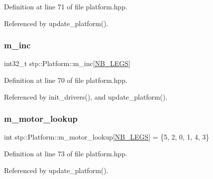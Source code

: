 Definition at line 71 of file platform.\+hpp.



Referenced by update\+\_\+platform().

\mbox{\label{classstp_1_1_platform_a8b8a183817a7536262e83e51edd4250a}} 
\subsubsection{\texorpdfstring{m\+\_\+inc}{m\_inc}}
{\footnotesize\ttfamily int32\+\_\+t stp\+::\+Platform\+::m\+\_\+inc\mbox{[}\hyperlink{model_8hpp_ae44092ed043cb4350e2df47fdee890b9}{N\+B\+\_\+\+L\+E\+GS}\mbox{]}\hspace{0.3cm}{\ttfamily [private]}}



Definition at line 70 of file platform.\+hpp.



Referenced by init\+\_\+drivers(), and update\+\_\+platform().

\mbox{\label{classstp_1_1_platform_a5a13db3be1f7180271f5045905c2b5e3}} 
\subsubsection{\texorpdfstring{m\+\_\+motor\+\_\+lookup}{m\_motor\_lookup}}
{\footnotesize\ttfamily int stp\+::\+Platform\+::m\+\_\+motor\+\_\+lookup\mbox{[}\hyperlink{model_8hpp_ae44092ed043cb4350e2df47fdee890b9}{N\+B\+\_\+\+L\+E\+GS}\mbox{]} = \{5, 2, 0, 1, 4, 3\}\hspace{0.3cm}{\ttfamily [private]}}



Definition at line 73 of file platform.\+hpp.



Referenced by update\+\_\+platform().

\mbox{\label{classstp_1_1_platform_aad5d3ee79554303bbdc928183155f01b}} 
